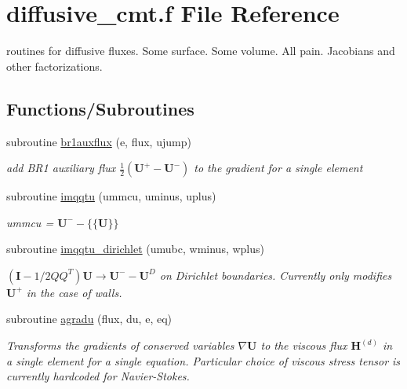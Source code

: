 \hypertarget{diffusive__cmt_8f}{\section{diffusive\-\_\-cmt.\-f File Reference}
\label{diffusive__cmt_8f}
}


routines for diffusive fluxes. Some surface. Some volume. All pain. Jacobians and other factorizations.  


\subsection*{Functions/\-Subroutines}
\begin{DoxyCompactItemize}
\item 
subroutine \hyperlink{group__vsurf_gac863c5b9f5cfae59ded7447a0c5e6d93}{br1auxflux} (e, flux, ujump)
\begin{DoxyCompactList}\small\item\em add B\-R1 auxiliary flux $\frac{1}{2}\left(\mathbf{U}^+-\mathbf{U}^-\right)$ to the gradient for a single element \end{DoxyCompactList}\item 
subroutine \hyperlink{group__vsurf_ga57cdf5eb9ed721fdf3cd454454b47122}{imqqtu} (ummcu, uminus, uplus)
\begin{DoxyCompactList}\small\item\em ummcu = $\mathbf{U}^--\{\{\mathbf{U}\}\}$ \end{DoxyCompactList}\item 
subroutine \hyperlink{group__bcond_ga01708cdee955465babb7a371d4e5effa}{imqqtu\-\_\-dirichlet} (umubc, wminus, wplus)
\begin{DoxyCompactList}\small\item\em $\left(\mathbf{I}-1/2QQ^T\right)\mathbf{U}\rightarrow\mathbf{U}^--\mathbf{U}^D$ on Dirichlet boundaries. Currently only modifies $\mathbf{U}^+$ in the case of walls. \end{DoxyCompactList}\item 
subroutine \hyperlink{group__vfjac_ga9087d56c6c467d3ffeb9aa6be3f43e82}{agradu} (flux, du, e, eq)
\begin{DoxyCompactList}\small\item\em Transforms the gradients of conserved variables $\nabla \mathbf{U}$ to the viscous flux $\mathbf{H}^{(d)}$ in a single element for a single equation. Particular choice of viscous stress tensor is currently hardcoded for Navier-\/\-Stokes. \end{DoxyCompactList}\item 

\end{DoxyCompactItemize}
